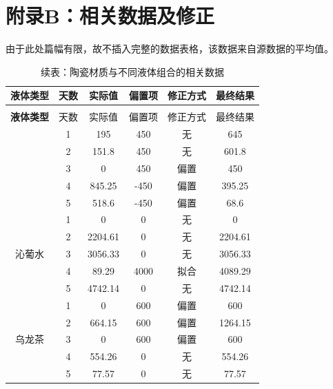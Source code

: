\documentclass[12pt,a4paper]{ctexart}
\begin{document}
\clearpage
\thispagestyle{empty}
\section{附录B：相关数据及修正}
由于此处篇幅有限，故不插入完整的数据表格，该数据来自源数据的平均值。
\begin{longtable}{c c c c c c}
  \caption{陶瓷材质与不同液体组合的相关数据} \\
  \toprule
  \textbf{液体类型} & 天数 & 实际值 & 偏置项 & 修正方式 & 最终结果 \\
  \midrule
  \endfirsthead  %
  
  \caption*{续表：陶瓷材质与不同液体组合的相关数据} \\
  \toprule
  \textbf{液体类型} & 天数 & 实际值 & 偏置项 & 修正方式 & 最终结果 \\
  \midrule
  \endhead  %
  
  \bottomrule
  \endlastfoot  %

  \multirow{5}{*}{水} 
    & 1 & 195      & 450    & 无       & 645      \\
    & 2 & 151.8    & 450    & 无       & 601.8    \\
    & 3 & 0        & 450    & 偏置     & 450      \\
    & 4 & 845.25   & -450   & 偏置     & 395.25   \\
    & 5 & 518.6    & -450   & 偏置     & 68.6     \\
  \midrule
  
  \multirow{5}{*}{沁葡水} 
    & 1 & 0        & 0      & 无     & 0        \\
    & 2 & 2204.61  & 0      & 无     & 2204.61  \\
    & 3 & 3056.33  & 0      & 无     & 3056.33  \\
    & 4 & 89.29    & 4000   & 拟合     & 4089.29  \\
    & 5 & 4742.14  & 0      & 无       & 4742.14  \\
  \midrule
  
  \multirow{5}{*}{乌龙茶} 
    & 1 & 0        & 600    & 偏置     & 600      \\
    & 2 & 664.15   & 600    & 偏置     & 1264.15  \\
    & 3 & 0        & 600    & 偏置     & 600      \\
    & 4 & 554.26   & 0      & 无       & 554.26   \\
    & 5 & 77.57    & 0      & 无       & 77.57    \\

\end{longtable}
\end{document}
